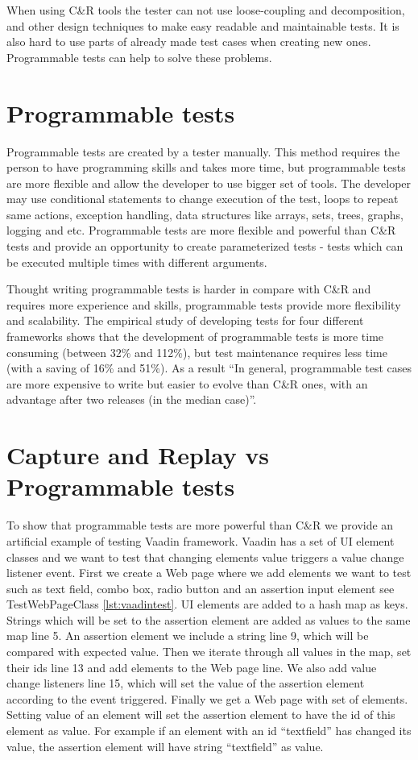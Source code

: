  When using C\&R tools the tester can
not use loose-coupling and decomposition, and other design techniques to make
easy readable and maintainable tests. It is also hard to use parts of already
made test cases when creating new ones. Programmable tests can help to solve these problems.

\section{Programmable tests} 
\label{sec:programTests}
Programmable tests are created by a tester manually. This method requires the
person to have programming skills and takes more time, but programmable tests
are more flexible and allow the developer to use bigger set of tools. The
developer may use conditional statements to change execution of the test,
loops to repeat same actions, exception handling, data structures like
arrays, sets, trees, graphs, logging and etc. Programmable tests are more
flexible and powerful than C\&R tests and provide an opportunity to create
parameterized tests - tests which can be executed multiple times with different arguments. 

      Thought writing programmable tests is harder in
      compare with C\&R and requires more experience and skills, programmable tests
      provide more flexibility and scalability. The empirical study
       of developing tests for four different frameworks shows that the development of programmable tests is more time
      consuming (between 32\% and 112\%), but test maintenance requires less
      time (with a saving of 16\% and 51\%). As a result ``In general, programmable test cases are more
      expensive to write but easier to evolve than C\&R ones, with an advantage
      after two releases (in the median case)''.\cite{CaptureReplay7}

 \section{Capture and Replay vs Programmable tests}
 To show that programmable tests are more powerful than C\&R we provide an
artificial example of testing Vaadin framework.	
Vaadin has a set of UI element classes and we want to	test that changing elements value triggers a value change listener event.
First we create a Web page where we add elements we
want to test such as text field, combo box, radio button and an	assertion
input element see TestWebPageClass \ref{lst:vaadintest}.
 UI elements are added to a hash map as keys. Strings which will be set to the
 assertion element are added as values to the same map line 5.
			An assertion element we include a string line 9, which will be  compared with
      expected value.  Then we iterate through all values in the map, set their
      ids line 13 and add elements to the Web page line. We also add value
      change listeners line 15, which will set the value of the assertion
      element according to the event triggered. Finally we get a Web page with set of elements. 
      Setting value of an element will set the assertion element to have the id
      of this element as value. For example if an element with an id
      ``textfield'' has changed its value, the assertion element will have
      string ``textfield'' as value.
					
